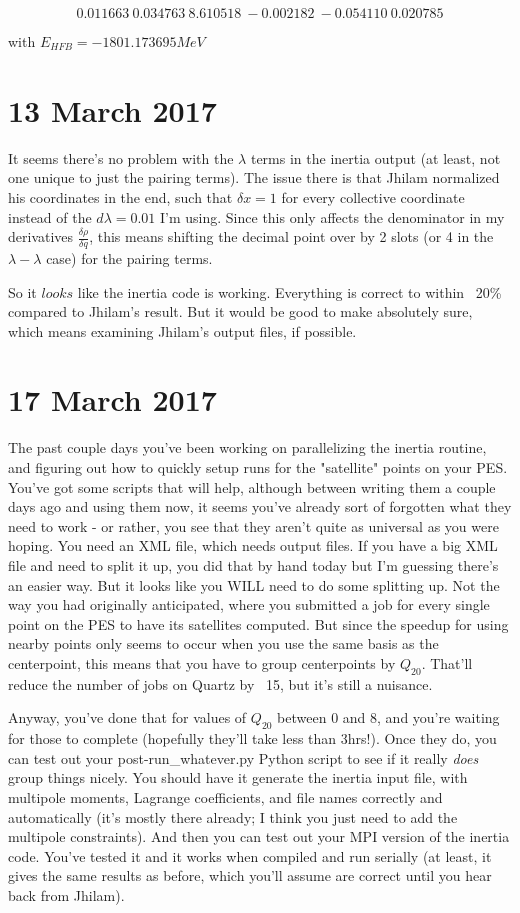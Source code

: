 \documentclass[]{report}
\begin{document}
\begin{equation}
    0.011663\    0.034763\    8.610518\   -0.002182\   -0.054110\    0.020785
\end{equation}

\noindent with $E_{HFB}=-1801.173695 MeV$

\section*{13 March 2017}
It seems there's no problem with the $\lambda$ terms in the inertia output (at least, not one unique to just the pairing terms).  The issue there is that Jhilam normalized his coordinates in the end, such that $\delta x=1$ for every collective coordinate instead of the $d\lambda=0.01$ I'm using. Since this only affects the denominator in my derivatives $\frac{\delta \rho}{\delta q}$, this means shifting the decimal point over by 2 slots (or 4 in the $\lambda-\lambda$ case) for the pairing terms.

So it $\mathit{looks}$ like the inertia code is working. Everything is correct to within ~20\% compared to Jhilam's result. But it would be good to make absolutely sure, which means examining Jhilam's output files, if possible. 

\section*{17 March 2017}
The past couple days you've been working on parallelizing the inertia routine, and figuring out how to quickly setup runs for the "satellite" points on your PES. You've got some scripts that will help, although between writing them a couple days ago and using them now, it seems you've already sort of forgotten what they need to work - or rather, you see that they aren't quite as universal as you were hoping. You need an XML file, which needs output files. If you have a big XML file and need to split it up, you did that by hand today but I'm guessing there's an easier way. But it looks like you WILL need to do some splitting up. Not the way you had originally anticipated, where you submitted a job for every single point on the PES to have its satellites computed. But since the speedup for using nearby points only seems to occur when you use the same basis as the centerpoint, this means that you have to group centerpoints by $Q_{20}$. That'll reduce the number of jobs on Quartz by ~15, but it's still a nuisance.

Anyway, you've done that for values of $Q_{20}$ between 0 and 8, and you're waiting for those to complete (hopefully they'll take less than 3hrs!). Once they do, you can test out your post-run\_whatever.py Python script to see if it really \textit{does} group things nicely. You should have it generate the inertia input file, with multipole moments, Lagrange coefficients, and file names correctly and automatically (it's mostly there already; I think you just need to add the multipole constraints). And then you can test out your MPI version of the inertia code. You've tested it and it works when compiled and run serially (at least, it gives the same results as before, which you'll assume are correct until you hear back from Jhilam).
\end{document}

